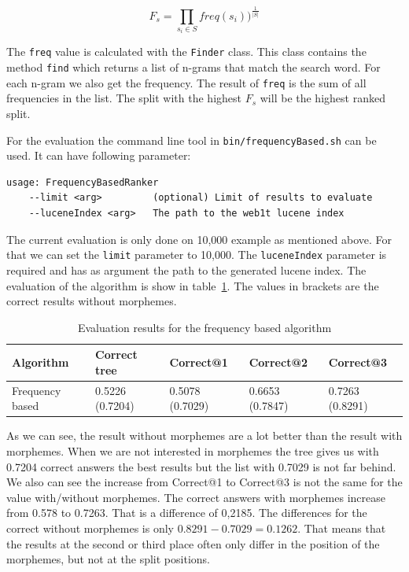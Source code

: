 \documentclass[11pt, accentcolor=tud9b, nochapname]{tudreport}
\begin{document}
\begin{equation}
  F_s = \prod_{s_i \in S} freq(s_i))^{\frac{1}{|S|}}
\end{equation}

The \texttt{freq} value is calculated with the \texttt{Finder} class. This class contains the method \texttt{find} which returns a list of n-grams that match the search word. For each n-gram we also get the frequency. The result of \texttt{freq} is the sum of all frequencies in the list. The split with the highest $F_s$ will be the highest ranked split.

For the evaluation the command line tool in \texttt{bin/frequencyBased.sh} can be used. It can have following parameter:

\begin{lstlisting}
usage: FrequencyBasedRanker
    --limit <arg>         (optional) Limit of results to evaluate
    --luceneIndex <arg>   The path to the web1t lucene index
\end{lstlisting}

The current evaluation is only done on 10,000 example as mentioned above. For that we can set the \texttt{limit} parameter to 10,000. The \texttt{luceneIndex} parameter is required and has as argument the path to the generated lucene index. The evaluation of the algorithm is show in table~\ref{eval_freq}. The values in brackets are the correct results without morphemes.

\begin{table}[h]
  \begin{center}
    \begin{tabular}{|l|l||l|l|l|}
      \hline
      \textbf{Algorithm} & \textbf{Correct tree} & \textbf{Correct@1} & \textbf{Correct@2} & \textbf{Correct@3} \\ \hline
      Frequency based & 0.5226  (0.7204) & 0.5078 (0.7029) & 0.6653 (0.7847) & 0.7263 (0.8291) \\ \hline
    \end{tabular}
  \end{center}
  \caption{Evaluation results for the frequency based algorithm}
  \label{eval_freq}
\end{table}

As we can see, the result without morphemes are a lot better than the result with morphemes. When we are not interested in morphemes the tree gives us with 0.7204 correct answers the best results but the list with 0.7029 is not far behind. We also can see the increase from Correct@1 to Correct@3 is not the same for the value with/without morphemes. The correct answers with morphemes increase from 0.578 to 0.7263. That is a difference of 0,2185. The differences for the correct without morphemes is only $0.8291-0.7029 = 0.1262$. That means that the results at the second or third place often only differ in the position of the morphemes, but not at the split positions.
\end{document}
